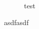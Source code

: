 \documentclass{article}
\begin{document}
\begin{figure}

\caption{test}
\end{figure}
asdfasdf
\end{document}
